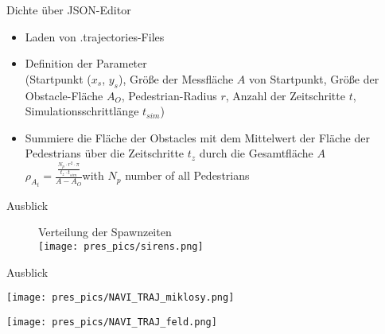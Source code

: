 \begin{frame}{Dichte über JSON-Editor}
	\begin{itemize}
		\item Laden von .trajectories-Files
		\item Definition der Parameter\\(Startpunkt ($x_s$, $y_s$), Größe der Messfläche $A$ von Startpunkt, Größe der Obstacle-Fläche $A_O$, Pedestrian-Radius $r$, Anzahl der Zeitschritte $t$, Simulationsschrittlänge $t_{sim}$)
		\item Summiere die Fläche der Obstacles mit dem Mittelwert der Fläche der Pedestrians über die Zeitschritte $t_z$ durch die Gesamtfläche $A$
		\\\vspace{0.5cm}
		\centering
		$\rho_{A_t} = \frac{\frac{N_p \cdot r^2 \cdot \pi}{t_z \cdot t_{sim}}}{A - A_O}$\hspace{1cm}with $N_p$ number of all Pedestrians
	\end{itemize}
\end{frame}
\begin{frame}{Ausblick}
	\begin{figure}
		Verteilung der Spawnzeiten\\
		\texttt{[image: pres\_pics/sirens.png]}
	\end{figure}
\end{frame}
\begin{frame}{Ausblick}
	\begin{minipage}{0.50\textwidth}
		\texttt{[image: pres\_pics/NAVI\_TRAJ\_miklosy.png]}
	\end{minipage} \hfill
	\begin{minipage}{0.48\textwidth}
		\texttt{[image: pres\_pics/NAVI\_TRAJ\_feld.png]}
	\end{minipage}
\end{frame}
